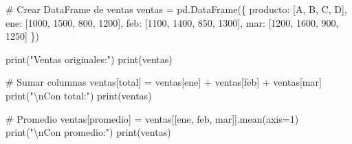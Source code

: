 \documentclass[
  doc,
  floatsintext,
  longtable,
  a4paper,
  nolmodern,
  notxfonts,
  notimes,
  12pt,
  colorlinks=true,linkcolor=blue,citecolor=blue,urlcolor=blue]{apa7}
\newenvironment{Shaded}{\begin{snugshade}}{\end{snugshade}}
\newcommand{\BuiltInTok}[1]{\textcolor[rgb]{0.00,0.23,0.31}{#1}}
\newcommand{\CharTok}[1]{\textcolor[rgb]{0.13,0.47,0.30}{#1}}
\newcommand{\CommentTok}[1]{\textcolor[rgb]{0.37,0.37,0.37}{#1}}
\newcommand{\DecValTok}[1]{\textcolor[rgb]{0.68,0.00,0.00}{#1}}
\newcommand{\NormalTok}[1]{\textcolor[rgb]{0.00,0.23,0.31}{#1}}
\newcommand{\OperatorTok}[1]{\textcolor[rgb]{0.37,0.37,0.37}{#1}}
\newcommand{\StringTok}[1]{\textcolor[rgb]{0.13,0.47,0.30}{#1}}
\begin{document}
\begin{Shaded}
\begin{Highlighting}[]
\CommentTok{\# Crear DataFrame de ventas}
\NormalTok{ventas }\OperatorTok{=}\NormalTok{ pd.DataFrame(\{}
    \StringTok{\textquotesingle{}producto\textquotesingle{}}\NormalTok{: [}\StringTok{\textquotesingle{}A\textquotesingle{}}\NormalTok{, }\StringTok{\textquotesingle{}B\textquotesingle{}}\NormalTok{, }\StringTok{\textquotesingle{}C\textquotesingle{}}\NormalTok{, }\StringTok{\textquotesingle{}D\textquotesingle{}}\NormalTok{],}
    \StringTok{\textquotesingle{}ene\textquotesingle{}}\NormalTok{: [}\DecValTok{1000}\NormalTok{, }\DecValTok{1500}\NormalTok{, }\DecValTok{800}\NormalTok{, }\DecValTok{1200}\NormalTok{],}
    \StringTok{\textquotesingle{}feb\textquotesingle{}}\NormalTok{: [}\DecValTok{1100}\NormalTok{, }\DecValTok{1400}\NormalTok{, }\DecValTok{850}\NormalTok{, }\DecValTok{1300}\NormalTok{],}
    \StringTok{\textquotesingle{}mar\textquotesingle{}}\NormalTok{: [}\DecValTok{1200}\NormalTok{, }\DecValTok{1600}\NormalTok{, }\DecValTok{900}\NormalTok{, }\DecValTok{1250}\NormalTok{]}
\NormalTok{\})}

\BuiltInTok{print}\NormalTok{(}\StringTok{"Ventas originales:"}\NormalTok{)}
\BuiltInTok{print}\NormalTok{(ventas)}

\CommentTok{\# Sumar columnas}
\NormalTok{ventas[}\StringTok{\textquotesingle{}total\textquotesingle{}}\NormalTok{] }\OperatorTok{=}\NormalTok{ ventas[}\StringTok{\textquotesingle{}ene\textquotesingle{}}\NormalTok{] }\OperatorTok{+}\NormalTok{ ventas[}\StringTok{\textquotesingle{}feb\textquotesingle{}}\NormalTok{] }\OperatorTok{+}\NormalTok{ ventas[}\StringTok{\textquotesingle{}mar\textquotesingle{}}\NormalTok{]}
\BuiltInTok{print}\NormalTok{(}\StringTok{"}\CharTok{\textbackslash{}n}\StringTok{Con total:"}\NormalTok{)}
\BuiltInTok{print}\NormalTok{(ventas)}

\CommentTok{\# Promedio}
\NormalTok{ventas[}\StringTok{\textquotesingle{}promedio\textquotesingle{}}\NormalTok{] }\OperatorTok{=}\NormalTok{ ventas[[}\StringTok{\textquotesingle{}ene\textquotesingle{}}\NormalTok{, }\StringTok{\textquotesingle{}feb\textquotesingle{}}\NormalTok{, }\StringTok{\textquotesingle{}mar\textquotesingle{}}\NormalTok{]].mean(axis}\OperatorTok{=}\DecValTok{1}\NormalTok{)}
\BuiltInTok{print}\NormalTok{(}\StringTok{"}\CharTok{\textbackslash{}n}\StringTok{Con promedio:"}\NormalTok{)}
\BuiltInTok{print}\NormalTok{(ventas)}


\end{Highlighting}
\end{Shaded}
\end{document}
